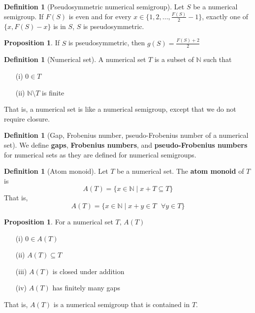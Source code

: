 \documentclass{article}
\theoremstyle{definition}
\theoremstyle{definition}
\newtheorem{defn}[thm]{Definition}
\theoremstyle{definition}
\newtheorem{prop}[thm]{Proposition}
\begin{document}
\begin{defn}[Pseudosymmetric numerical semigroup]
    Let $S$ be a numerical semigroup. If $F(S)$ is even and for every $x \in \{1, 2, ..., \frac{F(S)}{2} - 1\}$, exactly one of $\{x, F(S)-x\}$ is in $S$, $S$ is pseudosymmetric.
\end{defn}

\begin{prop}
    If $S$ is pseudosymmetric, then $g(S) = \frac{F(S)+2}{2}$
\end{prop}

\begin{defn}[Numerical set]
    A numerical set $T$ is a subset of $\mathbb{N}$ such that 
    \begin{enumerate}
        \item[(i)] $0\in T$
        \item[(ii)] $\mathbb{N} \setminus T$ is finite 
    \end{enumerate}
    That is, a numerical set is like a numerical semigroup, except that we do not require closure.
\end{defn}

\begin{defn}[Gap, Frobenius number, pseudo-Frobenius number of a numerical set]
    We define \textbf{gaps}, \textbf{Frobenius numbers}, and \textbf{pseudo-Frobenius numbers} for numerical sets as they are defined for numerical semigroups.
\end{defn}

\begin{defn}[Atom monoid]
    Let $T$ be a numerical set. The \textbf{atom monoid} of $T$ is 
    $$A(T) = \{x \in \mathbb{N} \mid x+ T \subseteq T\}$$
    That is, 
    $$A(T) = \{x \in \mathbb{N} \mid x+ y \in T \text{ } \forall y \in T\}$$
\end{defn}

\begin{prop}
For a numerical set $T$, $A(T)$
    \begin{enumerate}
        \item[(i)] $0 \in A(T)$ 
        \item[(ii)] $A(T) \subseteq T$
        \item[(iii)] $A(T)$ is closed under addition
        \item[(iv)] $A(T)$ has finitely many gaps
    \end{enumerate}

    That is, $A(T)$ is a numerical semigroup that is contained in $T$.
\end{prop}
\end{document}
